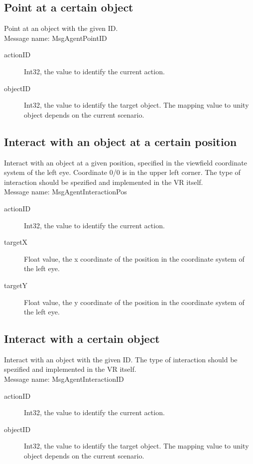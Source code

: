 \documentclass[a4paper,10pt]{scrartcl}
\begin{document}
\subsection{Point at a certain object}
Point at an object with the given ID.\\
Message name: MsgAgentPointID
\begin{description}
 \item [actionID] Int32, the value to identify the current action.
 \item [objectID] Int32, the value to identify the target object. The mapping value to unity object depends on the current scenario.
\end{description}

\subsection{Interact with an object at a certain position}
Interact with an object at a given position, specified in the viewfield coordinate system of the left eye. Coordinate 0/0 is in the upper left corner.
The type of interaction should be spezified and implemented in the VR itself.\\
Message name: MsgAgentInteractionPos 
\begin{description}
 \item [actionID] Int32, the value to identify the current action.
 \item [targetX] Float value, the x coordinate of the position in the coordinate system of the left eye.
 \item [targetY] Float value, the y coordinate of the position in the coordinate system of the left eye.
\end{description}

\subsection{Interact with a certain object}
Interact with an object with the given ID.
The type of interaction should be spezified and implemented in the VR itself.\\
Message name: MsgAgentInteractionID
\begin{description}
 \item [actionID] Int32, the value to identify the current action.
 \item [objectID] Int32, the value to identify the target object. The mapping value to unity object depends on the current scenario.
\end{description}
\end{document}

